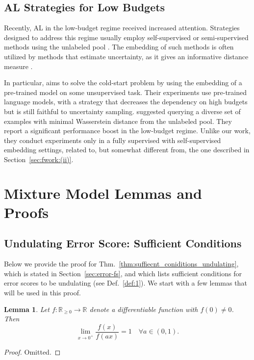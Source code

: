 \documentclass{article}
\newcommand{\R}{\mathbb{R}}
\newcommand{\ahard}{a}
\newcommand{\psn}{\R_{\ge 0}}
\newtheorem{lemma}{Lemma}
\begin{document}
\subsection{AL Strategies for Low Budgets}
Recently, AL in the low-budget regime received increased attention. Strategies designed to address this regime usually employ self-supervised or semi-supervised methods using the unlabeled pool \citep{gao2020consistency,hong2020deep,mahmood2021low,yehuda2022active}. The embedding of such methods is often utilized by methods that estimate uncertainty, as it gives an informative distance measure \citep{zhang2018unreasonable}.

In particular, \citet{DBLP:conf/emnlp/YuanLB20} aims to solve the cold-start problem by using the embedding of a pre-trained model on some unsupervised task. Their experiments use pre-trained language models, with a strategy that decreases the dependency on high budgets but is still faithful to uncertainty sampling. \citet{mahmood2021low} suggested querying a diverse set of examples with minimal Wasserstein distance from the unlabeled pool. They report a significant performance boost in the low-budget regime. Unlike our work, they conduct experiments only in a fully supervised with self-supervised embedding settings, related to, but somewhat different from, the one described in Section~\ref{sec:fwork:(ii)}.

\section{Mixture Model Lemmas and Proofs}




\subsection{Undulating Error Score: Sufficient Conditions}
\label{app:proof_for_thm_2}

Below we provide the proof for Thm.~\ref{thm:suffiecnt_coniditions_undulating}, which is stated in Section~\ref{sec:error-fs}, and which lists sufficient conditions for error scores to be undulating (see Def.~\ref{def:1}). We start with a few lemmas that will be used in this proof.

\begin{lemma}
\label{lemma:left_equal_1_new}
Let $f:\psn \rightarrow\mathbb{R}$ denote a differentiable function with $f(0)\neq 0$. Then 
\begin{equation*}
\lim_{x\to0^{+}}\frac{f\left(x\right)}{f\left(\ahard x\right)}=1\quad\forall \ahard\in(0,1).
\end{equation*}
\end{lemma}
\begin{proof}
Omitted.
\end{proof}
\end{document}
